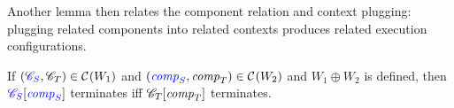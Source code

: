 \documentclass[acmsmall,screen]{acmart}\settopmatter{}
\renewcommand{\npair}[2][n]{#2}
\renewcommand{\nonExec}[1]{\plainfun{nonExec}{#1}}
\renewcommand{\comp}{\var{comp}}
\renewcommand{\lrexj}[1][]{\typesetlr{E}^{#1}_{\mathrm{xjmp}}}
\renewcommand{\lrrg}[2][]{\typesetlr{R}^{#1}_{#2}}
\renewcommand{\lrr}[1][]{\lrrg[#1]{\untrusted}}
\renewcommand{\lrcomp}[1][]{\typesetlr{C}^{#1}}
\renewcommand{\lrec}[1][]{\typesetlr{EC}^{#1}}
\renewcommand{\memSat}[3][]{\memSatGeneric{#1}{#2}{#3}{}}
\newcommand{\trgcm}{\textsc{LCM}}
\newcommand{\srccm}{\textsc{oLCM}}
\begin{document}
Another lemma then relates the component relation and context plugging: plugging related components into related contexts produces related execution configurations.
\begin{lemma}
  \label{lem:adeq-context-plug}
  If $\npair{\stpair{\context}{\context}}\in\lrcomp(W_1)$ and $\npair{\stpair{\comp}{\comp}} \in \lrcomp(W_2)$ and $W_1\oplus W_2$ is defined, then
  $\plug{\src{\context_S}}{\src{\comp_S}}$ terminates iff $\plug{\context_T}{\comp_T}$ terminates.
\end{lemma}
\end{document}
